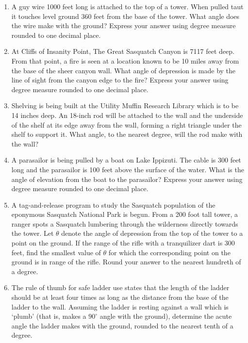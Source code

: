\documentclass{ximera}
\begin{document}
\begin{enumerate}

\setcounter{enumi}{\value{HW}}

\item A guy wire 1000 feet long is attached to the top of a tower.  When pulled taut it touches level ground 360 feet from the base of the tower.  What angle does the wire make with the ground?  Express your answer using degree measure rounded to one decimal place.

\item At Cliffs of Insanity Point, The Great Sasquatch Canyon is 7117 feet deep.  From that point, a fire is seen at a location known to be 10 miles away from the base of the sheer canyon wall.  What angle of depression is made by the line of sight from the canyon edge to the fire?  Express your answer using degree measure rounded to one decimal place.

\item Shelving is being built at the Utility Muffin Research Library which is to be 14 inches deep.  An 18-inch rod will be attached to the wall and the underside of the shelf at its edge away from the wall, forming a right triangle under the shelf to support it.  What angle, to the nearest degree, will the rod make with the wall?

\item A parasailor is being pulled by a boat on Lake Ippizuti.  The cable is 300 feet long and the parasailor is 100 feet above the surface of the water.  What is the angle of elevation from the boat to the parasailor?  Express your answer using degree measure rounded to one decimal place.

\item  A tag-and-release program to study the Sasquatch population of the eponymous Sasquatch National Park is begun.  From a 200 foot tall tower, a ranger spots a Sasquatch lumbering through the wilderness directly towards the tower.  Let $\theta$ denote the angle of depression from the top of the tower to a point on the ground.  If the range of the rifle with a tranquilizer dart is 300 feet, find the smallest value of $\theta$ for which the corresponding point on the ground is in range of the rifle.  Round your answer to the nearest hundreth of a degree.

\item  The rule of thumb for safe ladder use states that the length of the ladder should be at least four times as long as the distance from the base of the ladder to the wall. Assuming the ladder is resting against a wall which is `plumb' (that is, makes a $90^{\circ}$ angle with the ground), determine the acute angle the ladder makes with the ground, rounded to the nearest tenth of a degree.

\setcounter{HW}{\value{enumi}}

\end{enumerate}
\end{document}
